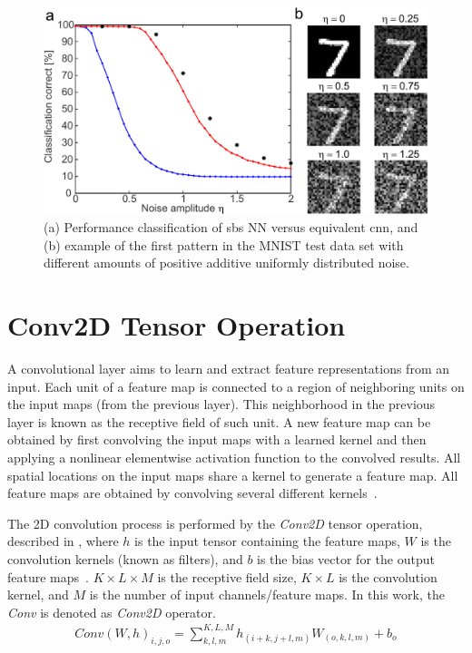 \begin{figure}[b!]
	\centering
	\includegraphics[width=0.5\columnwidth]{./chapters/sbs_accelerator/figures/sbs_robustnes.pdf}
	\caption{(a) Performance classification of \gls{sbs} NN versus equivalent \gls{cnn}, and (b) example of the first pattern in the MNIST test data set with different amounts of positive additive uniformly distributed noise.}
	\label{fig:robustnes_sbs}
\end{figure}

\section{Conv2D Tensor Operation}
A convolutional layer aims to learn and extract feature representations from an input. Each unit of a feature map is connected to a region of neighboring units on the input maps (from the previous layer). This neighborhood in the previous layer is known as the receptive field of such unit. A new feature map can be obtained by first convolving the input maps with a learned kernel and then applying a nonlinear elementwise activation function to the convolved results. All spatial locations on the input maps share a kernel to generate a feature map. All feature maps are obtained by convolving several different kernels~\cite{gu2018recent}.


The 2D convolution process is performed by the \emph{Conv2D} tensor operation, described in , where $h$ is the input tensor containing the feature maps, $W$ is the convolution kernels (known as filters), and $b$ is the bias vector for the output feature maps~\cite{goodfellow2016deep}. $K\times L\times M$ is the receptive field size, $K\times L$ is the convolution kernel, and $M$ is the number of input channels/feature maps. In this work, the \emph{Conv} is denoted as \emph{Conv2D} operator.
\begin{eqnarray} \label{eq:conv2D}
Conv\left(W,h\right)_{i,j,o}=\sum_{k,l,m}^{K,L,M} h_{(i+k,j+l,m)} W_{(o,k,l,m)}+b_{o}
\end{eqnarray}

